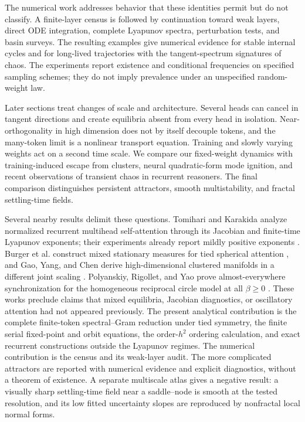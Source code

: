 \documentclass[11pt,a4paper]{article}
\theoremstyle{definition}
\begin{document}
The numerical work addresses behavior that these identities permit but do not
classify.  A finite-layer census is followed by continuation toward weak layers,
direct ODE integration, complete Lyapunov spectra, perturbation tests, and basin
surveys.  The resulting examples give numerical evidence for stable internal cycles
and for long-lived trajectories with the tangent-spectrum signatures of chaos.
The experiments report existence and conditional frequencies on specified sampling
schemes; they do not imply prevalence under an unspecified random-weight law.

Later sections treat changes of scale and architecture.  Several heads can cancel in
tangent directions and create equilibria absent from every head in isolation.
Near-orthogonality in high dimension does not by itself decouple tokens, and the
many-token limit is a nonlinear transport equation.  Training and slowly varying
weights act on a second time scale.  We compare our fixed-weight dynamics with
training-induced escape from clusters, neural quadratic-form mode ignition, and
recent observations of transient chaos in recurrent reasoners.  The final comparison
distinguishes persistent attractors, smooth multistability, and fractal settling-time
fields.

Several nearby results delimit these questions.  Tomihari and Karakida analyze
normalized recurrent multihead self-attention through its Jacobian and finite-time
Lyapunov exponents; their experiments already report mildly positive exponents
\cite{tomihari2025recurrent}.  Burger et al. construct mixed stationary measures for
tied spherical attention \cite{burger2025layernorm}, and Gao, Yang, and Chen derive
high-dimensional clustered manifolds in a different joint scaling
\cite{gao2026clustered}.  Polyanskiy, Rigollet, and Yao prove almost-everywhere
synchronization for the homogeneous reciprocal circle model at all $\beta\geq0$
\cite{polyanskiy2025circle}.  These works preclude claims that mixed equilibria,
Jacobian diagnostics, or oscillatory attention had not appeared previously.  The
present analytical contribution is the complete finite-token spectral--Gram reduction
under tied symmetry, the finite serial fixed-point and orbit equations, the
order-$h^2$ ordering calculation, and exact recurrent constructions outside the
Lyapunov regimes.  The numerical contribution is the census and its weak-layer
audit.  The more complicated attractors are
reported with numerical evidence and explicit diagnostics, without a theorem of
existence.  A separate multiscale atlas gives a negative result: a visually sharp
settling-time field near a saddle--node is smooth at the tested resolution, and its
low fitted uncertainty slopes are reproduced by nonfractal local normal forms.
\end{document}
